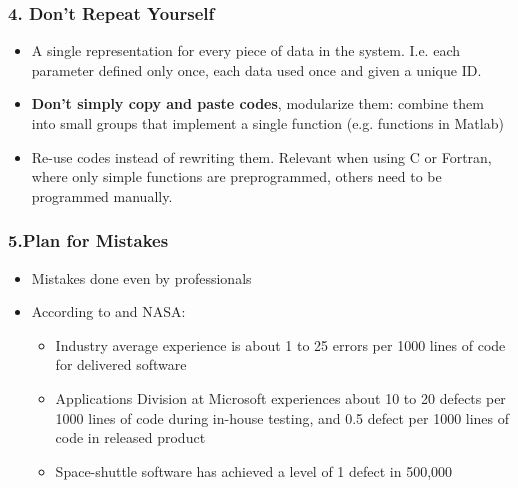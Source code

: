 \documentclass{beamer}
\newcommand{\highlight}[1]{{\color{blue}{#1}}}
\renewcommand{\highlight}[1]{{\textbf{#1}}}
\begin{document}
\begin{frame}
\frametitle{4. Don't Repeat Yourself}
\begin{itemize}
\item A single representation for every piece of data in the system. I.e. each parameter defined only once, each data used once and given a unique ID.
\item \highlight{Don't simply copy and paste codes}, modularize them: combine them into small groups that implement a single function (e.g. functions in Matlab)
\item Re-use codes instead of rewriting them. Relevant when using C or Fortran, where only simple functions are preprogrammed, others need to be programmed manually.
\end{itemize}
\end{frame}
\begin{frame}
\frametitle{5.Plan for Mistakes}
\begin{itemize}
\item Mistakes done even by professionals
\item According to \parencite{McConnell2004} and NASA:
\begin{itemize}
  \item Industry average experience is about 1 to 25 errors per 1000 lines of code for delivered software
  \item Applications Division at Microsoft experiences about 10 to 20 defects per 1000 lines of code during in-house testing, and 0.5 defect per 1000 lines of code in released product
  \item Space-shuttle software has achieved a level of 1 defect in 500,000
\end{itemize}

\end{itemize}
\end{frame}
\end{document}
